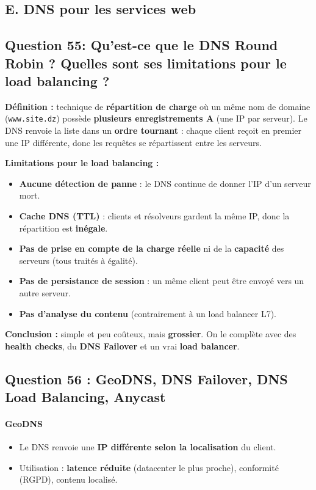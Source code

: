\documentclass[12pt,a4paper]{article}
\begin{document}
\subsection*{E. DNS pour les services web}


\subsection*{Question 55: Qu'est-ce que le DNS Round Robin ? Quelles sont ses limitations pour le load balancing ?}

\textbf{D\'efinition :} technique de \textbf{r\'epartition de charge} o\`u un m\^eme nom de domaine (\texttt{www.site.dz}) poss\`ede \textbf{plusieurs enregistrements A} (une IP par serveur). Le DNS renvoie la liste dans un \textbf{ordre tournant} : chaque client re\c{c}oit en premier une IP diff\'erente, donc les requ\^etes se r\'epartissent entre les serveurs.

\textbf{Limitations pour le load balancing :}
\begin{itemize}
  \item \textbf{Aucune d\'etection de panne} : le DNS continue de donner l'IP d'un serveur mort.
  \item \textbf{Cache DNS (TTL)} : clients et r\'esolveurs gardent la m\^eme IP, donc la r\'epartition est \textbf{in\'egale}.
  \item \textbf{Pas de prise en compte de la charge r\'eelle} ni de la \textbf{capacit\'e} des serveurs (tous trait\'es \`a \'egalit\'e).
  \item \textbf{Pas de persistance de session} : un m\^eme client peut \^etre envoy\'e vers un autre serveur.
  \item \textbf{Pas d'analyse du contenu} (contrairement \`a un load balancer L7).
\end{itemize}

\textbf{Conclusion :} simple et peu co\^uteux, mais \textbf{grossier}. On le compl\`ete avec des \textbf{health checks}, du \textbf{DNS Failover} et un vrai \textbf{load balancer}.

\subsection*{Question 56 : GeoDNS, DNS Failover, DNS Load Balancing, Anycast}

\paragraph{GeoDNS}
\begin{itemize}
  \item Le DNS renvoie une \textbf{IP diff\'erente selon la localisation} du client.
  \item Utilisation : \textbf{latence r\'eduite} (datacenter le plus proche), conformit\'e (RGPD), contenu localis\'e.
\end{itemize}
\end{document}
